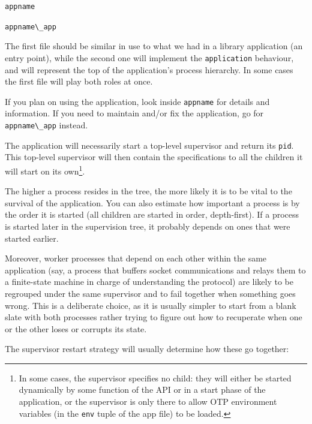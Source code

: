 \documentclass[11pt, oneside]{book}   	%
\newcommand{\module}[1]{\Verb`#1`}
\newcommand{\expression}[1]{\Verb`#1`}
\begin{document}
\begin{enumerate*}
	\item \module{appname}
	\item \module{appname\_app}
\end{enumerate*}

The first file should be similar in use to what we had in a library application (an entry point), while the second one will implement the \module{application} behaviour, and will represent the top of the application's process hierarchy. In some cases the first file will play both roles at once.

If you plan on using the application, look inside \module{appname} for details and information. If you need to maintain and/or fix the application, go for \module{appname\_app} instead.

The application will necessarily start a top-level supervisor and return its \expression{pid}. This top-level supervisor will then contain the specifications to all the children it will start on its own\footnote{In some cases, the supervisor specifies no child: they will either be started dynamically by some function of the API or in a start phase of the application, or the supervisor is only there to allow OTP environment variables (in the \expression{env} tuple of the app file) to be loaded.}.

The higher a process resides in the tree, the more likely it is to be vital to the survival of the application. You can also estimate how important a process is by the order it is started (all children are started in order, depth-first). If a process is started later in the supervision tree, it probably depends on ones that were started earlier.

Moreover, worker processes that depend on each other within the same application (say, a process that buffers socket communications and relays them to a finite-state machine in charge of understanding the protocol) are likely to be regrouped under the same supervisor and to fail together when something goes wrong. This is a deliberate choice, as it is usually simpler to start from a blank slate with both processes rather trying to figure out how to recuperate when one or the other loses or corrupts its state.

The supervisor restart strategy will usually determine how these go together:
\end{document}
